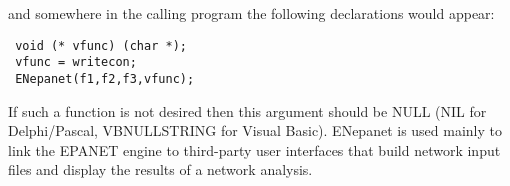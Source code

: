   
 and somewhere in the calling program the following declarations would appear:  
 
\begin{lstlisting}
 void (* vfunc) (char *);
 vfunc = writecon;
 ENepanet(f1,f2,f3,vfunc);
 \end{lstlisting}

  
 If such a function is not desired then this argument should be NULL (NIL for Delphi/Pascal, 
 VBNULLSTRING for Visual Basic).
 ENepanet is used mainly to link the EPANET engine to third-party user interfaces that build network 
 input files and display the results of a network analysis.
 
